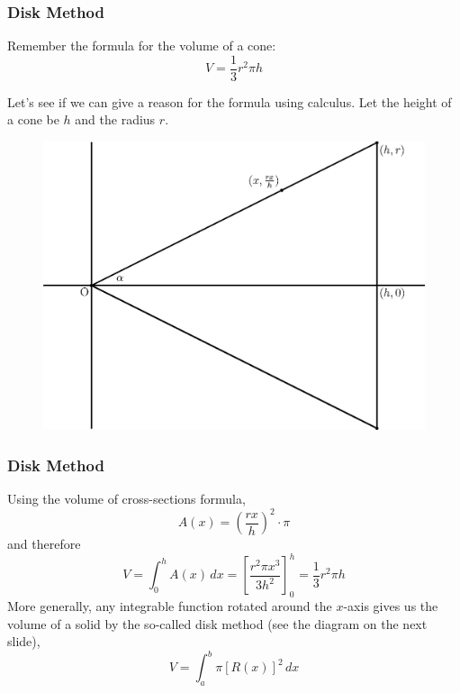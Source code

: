 \documentclass[xcolor=dvipsnames]{beamer}
\begin{document}

\begin{frame}
  \frametitle{Disk Method}
Remember the formula for the volume of a cone:
\begin{equation}
  \label{eq:veishiir}
   V=\frac{1}{3}r^{2}\pi{}h 
\end{equation}

Let's see if we can give a reason for the formula using calculus. Let
the height of a cone be $h$ and the radius $r$.

\begin{figure}[h]
  \includegraphics[scale=0.4]{./diagrams/conevol.eps}
\end{figure}
\end{frame}

\begin{frame}
  \frametitle{Disk Method}
  Using the volume of cross-sections formula,
\begin{equation}
  \label{eq:deiwizou}
  A(x)=\left(\frac{rx}{h}\right)^{2}\cdot\pi
\end{equation}
and therefore
\begin{equation}
  \label{eq:eebeoghe}
  V=\int_{0}^{h}A(x)\,dx=\left[\frac{r^{2}\pi{}x^{3}}{3h^{2}}\right]_{0}^{h}=\frac{1}{3}r^{2}\pi{}h
\end{equation}
More generally, any integrable function rotated around the $x$-axis gives us the
volume of a solid by the so-called \alert{disk method} (see the
diagram on the next slide),
\begin{equation}
  \label{eq:eipahbuy}
  V=\int_{a}^{b}\pi[R(x)]^{2}\,dx
\end{equation}
\end{frame}
\end{document}

